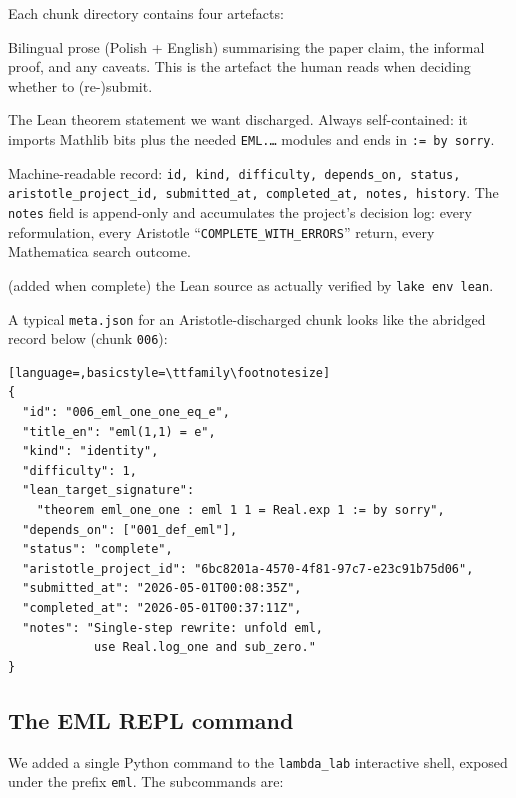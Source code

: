 \documentclass[11pt,a4paper]{article}
\theoremstyle{plain}
\theoremstyle{definition}
\begin{document}
Each chunk directory contains four artefacts:

\begin{description}[style=nextline,leftmargin=2em]
  \item[\texttt{chunk.md}] Bilingual prose (Polish + English) summarising
    the paper claim, the informal proof, and any caveats.  This is the
    artefact the human reads when deciding whether to (re-)submit.
  \item[\texttt{target.lean}] The Lean theorem statement we want
    discharged.  Always self-contained: it imports Mathlib bits plus the
    needed \texttt{EML.\dots} modules and ends in \texttt{:= by sorry}.
  \item[\texttt{meta.json}] Machine-readable record:
    \texttt{id, kind, difficulty, depends\_on, status,
    aristotle\_project\_id, submitted\_at, completed\_at, notes,
    history}.  The \texttt{notes} field is append-only and accumulates
    the project's decision log: every reformulation, every
    Aristotle ``\texttt{COMPLETE\_WITH\_ERRORS}'' return, every Mathematica
    search outcome.
  \item[\texttt{result.lean}] (added when complete) the Lean source as
    actually verified by \texttt{lake env lean}.
\end{description}

A typical \texttt{meta.json} for an Aristotle-discharged chunk looks
like the abridged record below (chunk \texttt{006}):

\begin{lstlisting}[language=,basicstyle=\ttfamily\footnotesize]
{
  "id": "006_eml_one_one_eq_e",
  "title_en": "eml(1,1) = e",
  "kind": "identity",
  "difficulty": 1,
  "lean_target_signature":
    "theorem eml_one_one : eml 1 1 = Real.exp 1 := by sorry",
  "depends_on": ["001_def_eml"],
  "status": "complete",
  "aristotle_project_id": "6bc8201a-4570-4f81-97c7-e23c91b75d06",
  "submitted_at": "2026-05-01T00:08:35Z",
  "completed_at": "2026-05-01T00:37:11Z",
  "notes": "Single-step rewrite: unfold eml,
            use Real.log_one and sub_zero."
}
\end{lstlisting}

\subsection{The EML REPL command}

We added a single Python command to the \texttt{lambda\_lab} interactive
shell, exposed under the prefix \texttt{eml}.  The subcommands are:
\end{document}
